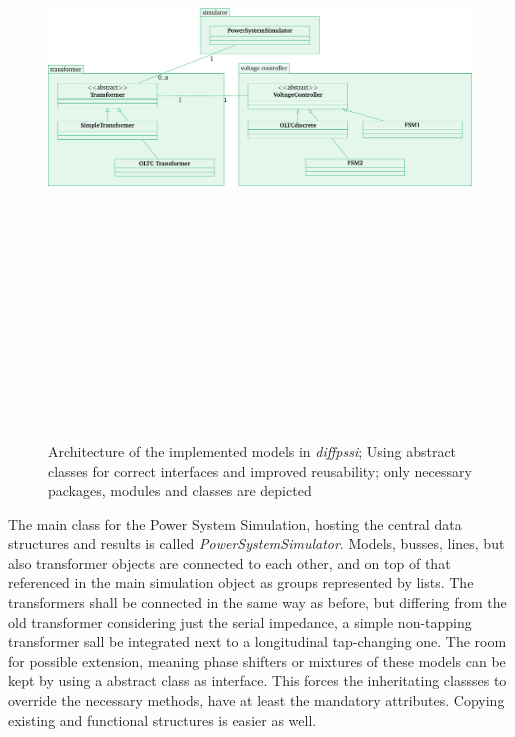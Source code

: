\begin{figure}[htbp!]
        \centering
        \includegraphics[angle=90, height=18cm]{./tikz_graphics/images/software_structure.pdf}%
        \caption[Architecture of the implemented models in \textit{diffpssi}]{Architecture of the implemented models in \textit{diffpssi}; Using abstract classes for correct interfaces and improved reusability; only necessary packages, modules and classes are depicted}
        \label{fig:transformer-architecture}
\end{figure}

The main class for the Power System Simulation, hosting the central data structures and results is called \textit{PowerSystemSimulator}.
Models, busses, lines, but also transformer objects are connected to each other, and on top of that referenced in the main simulation object as groups represented by lists.
The transformers shall be connected in the same way as before, but differing from the old transformer considering just the serial impedance, a simple non-tapping transformer sall be integrated next to a longitudinal tap-changing one.
The room for possible extension, meaning phase shifters or mixtures of these models can be kept by using a abstract class as interface.
This forces the inheritating classses to override the necessary methods, have at least the mandatory attributes.
Copying existing and functional structures is easier as well.

